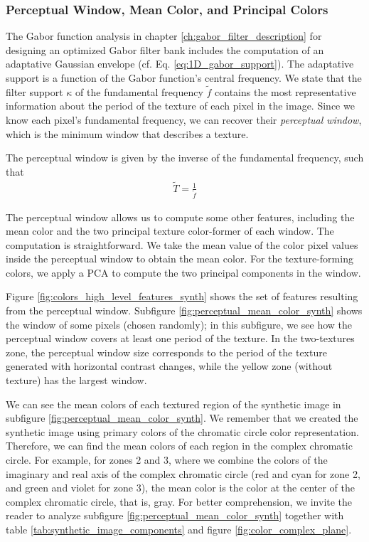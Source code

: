 \documentclass[journal]{IEEEtran}
\begin{document}
\subsubsection{Perceptual Window, Mean Color, and Principal Colors}
The Gabor function analysis in chapter \ref{ch:gabor_filter_description} for designing an optimized Gabor filter bank includes the computation of an adaptative Gaussian envelope (cf. Eq. \eqref{eq:1D_gabor_support}). The adaptative support is a function of the Gabor function's central frequency. We state that the filter support $\kappa$ of the fundamental frequency $\widetilde{f}$ contains the most representative information about the period of the texture of each pixel in the image. Since we know each pixel's fundamental frequency, we can recover their \textit{perceptual window}, which is the minimum window that describes a texture.

The perceptual window is given by the inverse of the fundamental frequency, such that
\begin{gather}
    \widetilde{T} = \frac{1}{\widetilde{f}} \label{eq:perceptual_window}
\end{gather}

The perceptual window allows us to compute some other features, including the mean color and the two principal texture color-former of each window. The computation is straightforward. We take the mean value of the color pixel values inside the perceptual window to obtain the mean color. For the texture-forming colors, we apply a PCA to compute the two principal components in the window.

Figure \ref{fig:colors_high_level_features_synth} shows the set of features resulting from the perceptual window. Subfigure \ref{fig:perceptual_mean_color_synth} shows the window of some pixels (chosen randomly); in this subfigure, we see how the perceptual window covers at least one period of the texture. In the two-textures zone, the perceptual window size corresponds to the period of the texture generated with horizontal contrast changes, while the yellow zone (without texture) has the largest window. 

We can see the mean colors of each textured region of the synthetic image in subfigure \ref{fig:perceptual_mean_color_synth}. We remember that we created the synthetic image using primary colors of the chromatic circle color representation. Therefore, we can find the mean colors of each region in the complex chromatic circle. For example, for zones 2 and 3, where we combine the colors of the imaginary and real axis of the complex chromatic circle (red and cyan for zone 2, and green and violet for zone 3), the mean color is the color at the center of the complex chromatic circle, that is, gray. For better comprehension, we invite the reader to analyze subfigure \ref{fig:perceptual_mean_color_synth} together with table \ref{tab:synthetic_image_components} and figure \ref{fig:color_complex_plane}.
\end{document}
